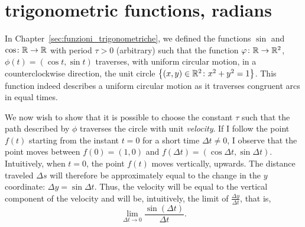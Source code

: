 \section{trigonometric functions, radians}

In Chapter~\ref{sec:funzioni_trigonometriche}, we defined the functions $\sin$
and $\cos\colon {\mathbb R}\to {\mathbb R}$ with period $\tau>0$ (arbitrary) such that the
function $\varphi\colon {\mathbb R}\to{\mathbb R}^2$, $\phi(t)=(\cos t, \sin t)$ traverses, with
uniform circular motion, in a counterclockwise direction, the unit circle
${\left\{ (x,y)\in {\mathbb R}^2\colon x^2+y^2=1 \right\}}$. This function indeed describes a
uniform circular motion as it traverses congruent arcs in equal times.

We now wish to show that it is possible to choose the constant $\tau$ such that
the path described by $\phi$ traverses the circle with unit \emph{velocity}.
%
If I follow the point $f(t)$ starting from the instant $t=0$ for a short time
$\Delta t\neq 0$, I observe that the point moves between $f(0) = (1,0)$ and
$f(\Delta t) = (\cos \Delta t, \sin \Delta t)$.
%
Intuitively, when $t=0$, the point $f(t)$ moves vertically, upwards. The
distance traveled $\Delta s$ will therefore be approximately equal to the change
in the $y$ coordinate: $\Delta y = \sin \Delta t$.
Thus, the velocity will be equal to the vertical component of the velocity and
will be, intuitively, the limit of $\frac{\Delta y}{\Delta t}$, that is,
\[
\lim_{\Delta t\to 0} \frac{\sin(\Delta t)}{\Delta t}.  
\]

